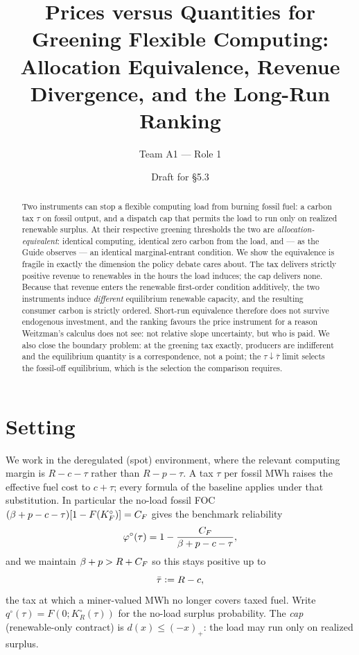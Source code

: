 \documentclass[11pt,reqno]{amsart}
\theoremstyle{plain}\newtheorem{theorem}{Theorem}\newtheorem{proposition}[theorem]{Proposition}
\theoremstyle{definition}\newtheorem{definition}[theorem]{Definition}
\theoremstyle{remark}\newtheorem{remark}[theorem]{Remark}
\newcommand{\KR}{K_R}\newcommand{\KF}{K_F}\newcommand{\KM}{K_M}
\newcommand{\KRo}{K_R^{\circ}}\newcommand{\KFo}{K_F^{\circ}}
\newcommand{\bp}{\beta+p}\newcommand{\E}{\mathbb{E}}\newcommand{\phio}{\varphi^{\circ}}
\newcommand{\qo}{q^{\circ}}\newcommand{\FKR}{F_{\!\KR}}\newcommand{\eqdef}{\vcentcolon=}
\begin{document}
\title[Prices versus Quantities for Greening Flexible Computing]
{Prices versus Quantities for Greening Flexible Computing:\\
Allocation Equivalence, Revenue Divergence, and the Long-Run Ranking}
\author{Team A1 --- Role 1}
\date{Draft for \S5.3}

\begin{abstract}
Two instruments can stop a flexible computing load from burning fossil fuel: a carbon tax
$\tau$ on fossil output, and a dispatch cap that permits the load to run only on realized
renewable surplus. At their respective greening thresholds the two are
\emph{allocation-equivalent}: identical computing, identical zero carbon from the load, and
--- as the Guide observes --- an identical marginal-entrant condition. We show the
equivalence is fragile in exactly the dimension the policy debate cares about. The tax
delivers strictly positive revenue to renewables in the hours the load induces; the cap
delivers none. Because that revenue enters the renewable first-order condition additively,
the two instruments induce \emph{different} equilibrium renewable capacity, and the
resulting consumer carbon is strictly ordered. Short-run equivalence therefore does not
survive endogenous investment, and the ranking favours the price instrument for a reason
Weitzman's calculus does not see: not relative slope uncertainty, but who is paid. We also
close the boundary problem: at the greening tax exactly, producers are indifferent and the
equilibrium quantity is a correspondence, not a point; the $\tau\downarrow\bar\tau$ limit
selects the fossil-off equilibrium, which is the selection the comparison requires.
\end{abstract}
\maketitle

\section{Setting}
We work in the deregulated (spot) environment, where the relevant computing margin is
$R-c-\tau$ rather than $R-p-\tau$. A tax $\tau$ per fossil MWh raises the effective fuel
cost to $c+\tau$; every formula of the baseline applies under that substitution. In
particular the no-load fossil FOC $(\bp-c-\tau)[1-F(\KFo)]=\CF$ gives the benchmark
reliability
\[
  \phio(\tau)=1-\frac{\CF}{\bp-c-\tau},
\]
and we maintain $\bp>R+\CF$ so this stays positive up to
\[
  \bar\tau\eqdef R-c,
\]
the tax at which a miner-valued MWh no longer covers taxed fuel. Write $\qo(\tau)=F(0;\KRo(\tau))$
for the no-load surplus probability. The \emph{cap} (renewable-only contract) is
$d(x)\le(-x)_+$: the load may run only on realized surplus.
\end{document}
